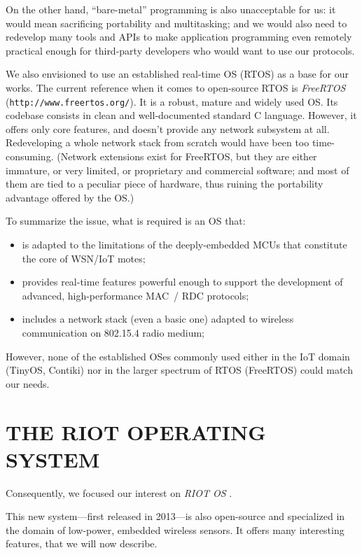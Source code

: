\documentclass[a4paper,twoside]{article}
\begin{document}
On the other hand, ``bare-metal'' programming is also unacceptable for us:
it would mean sacrificing portability and multitasking; and we would also
need to redevelop many tools and APIs to make application programming
even remotely practical enough for third-party developers who would
want to use our protocols.

We also envisioned to use an established real-time OS (RTOS) as a base
for our works. The current reference when it comes to open-source RTOS is
\emph{FreeRTOS} (\texttt{http://www.freertos.org/}). It is a robust, mature
and widely used OS. Its codebase consists in clean and well-documented
standard C language. However, it offers only core features, and doesn't
provide any network subsystem at all. Redeveloping a whole network stack
from scratch would have been too time-consuming.
(Network extensions exist for FreeRTOS, but they are either immature,
or very limited, or proprietary and commercial software; and most of them
are tied to a peculiar piece of hardware, thus ruining
the portability advantage offered by the OS.)

\bigskip

To summarize the issue, what is required is an OS that:
\begin{itemize}
\item is adapted to the limitations of the deeply-embedded MCUs that constitute
      the core of WSN/IoT motes;
\item provides real-time features powerful enough to support the
      development of advanced, high-performance MAC~/ RDC protocols;
\item includes a network stack (even a basic one) adapted to wireless
      communication on 802.15.4 radio medium;
\end{itemize}
However,  none of the established OSes commonly used either in the IoT domain
(TinyOS, Contiki) nor in the larger spectrum of RTOS (FreeRTOS)
could match our needs.


\section{\uppercase{The RIOT Operating System}}

Consequently, we focused our interest on \emph{RIOT OS} \cite{RIOT}.

This new system---first released in 2013---is also open-source and
specialized in the domain of low-power, embedded wireless sensors.
It offers many interesting features, that we will now describe.
\end{document}
